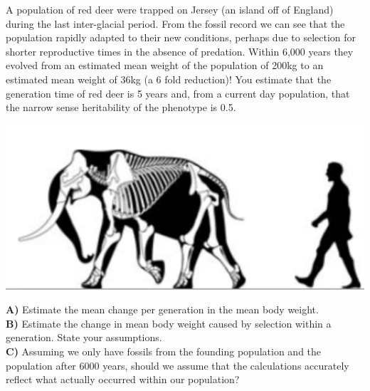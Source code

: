 

\begin{question}
A population of red deer were trapped on Jersey (an island off of
England) during the last inter-glacial period. From the fossil record \cite{lister:89}
we can see that the population rapidly adapted to their new
conditions, perhaps due to selection for shorter reproductive times in
the absence of predation. Within 6,000 years they evolved from an estimated mean weight of
the population of 200kg to an estimated mean weight of 36kg (a 6 fold
reduction)! You estimate that the generation time
of red deer is 5 years and, from a current day population, that the narrow sense heritability of the
phenotype is 0.5.\\

 \begin{marginfigure}
 \begin{center}
 \includegraphics[width=\textwidth]{illustration_images/Quant_gen/dwarf_elephant/M_exilis_skeletal.pdf} \end{center}
 \caption{It's not just deer that evolve to be small on islands,
  pygmy mammoths and elephants have evolved from large mainland species
  on numerous islands. For example, the
   California Channel Islands were home to a dwarf mammoth until about 13,000 years
   ago. \newline \noindent \tiny{Santa
   Rosa {\it Mammuthus exilis}. \href{https://en.wikipedia.org/wiki/Pygmy_mammoth\#/media/File:M._exilis_skeletal.png}{wikimedia}, CC BY 3.0.} }\label{Fig:Pygmy_mammoth}
 \end{marginfigure}
{\bf A)}	Estimate the mean change per generation in the mean body weight. \\

{\bf B)}	Estimate the change in mean body weight caused by
selection within a generation. State your assumptions.\\

{\bf C)}	Assuming we only have fossils from the founding population and the population after 6000 years, should we assume that the calculations accurately reflect what actually occurred within our population?
\end{question}


